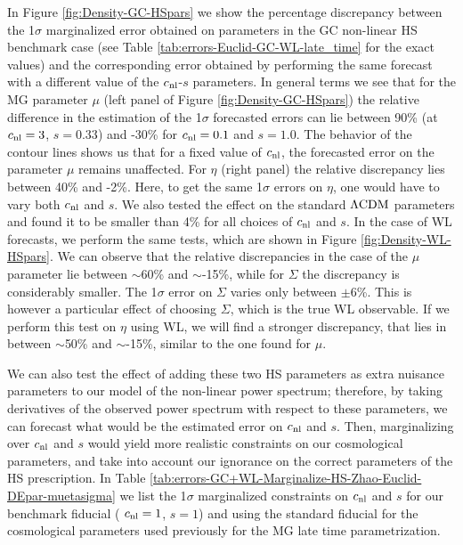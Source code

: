In Figure \ref{fig:Density-GC-HSpars} we show
the percentage discrepancy between the 1$\sigma$ marginalized error
obtained on parameters in the GC non-linear HS benchmark case (see Table
\ref{tab:errors-Euclid-GC-WL-late_time}
for the exact values) and the corresponding error obtained by performing
the same forecast with a different value of the $c_{\mathrm{nl}}$-$s$ parameters.
In general terms we see that for the MG parameter $\mu$
(left panel of Figure \ref{fig:Density-GC-HSpars}) the relative difference
in the estimation of the 1$\sigma$ forecasted errors can lie between
90\% (at $c_{\mathrm{nl}}=3$, $s=0.33$) and -30\% for $c_{\mathrm{nl}}=0.1$ and $s=1.0$.
The behavior of the contour lines shows us that for a fixed value of $c_{\mathrm{nl}}$, 
the forecasted error on the parameter $\mu$ remains unaffected.
For $\eta$ (right panel) the relative discrepancy lies between
40\% and -2\%. Here, to get the same 1$\sigma$ errors on $\eta$, one would have to vary 
both $c_{\mathrm{nl}}$ and $s$.
We also tested the effect on the standard $\Lambda\mathrm{CDM}$ parameters and found it to be smaller than
4\% for all choices of $c_{\mathrm{nl}}$ and $s$.
In the case of WL forecasts, we perform the same tests, which are shown in Figure \ref{fig:Density-WL-HSpars}.
We can observe that the relative discrepancies in the case of the
$\mu$ parameter lie between $\sim$60\% and $\sim$-15\%, while for $\Sigma$ the discrepancy is considerably smaller. 
The 1$\sigma$ error on $\Sigma$ varies only between $\pm 6$\%.
This is however a particular effect of choosing $\Sigma$, which is the true WL observable.
If we perform this test on $\eta$ using WL, we will find a stronger discrepancy,
that lies in between $\sim$50\% and $\sim$-15\%, similar to the one found for $\mu$.
 

We can also test the effect of adding these two HS parameters as extra
nuisance parameters to our model of the non-linear power spectrum;
therefore, by taking derivatives of the observed power spectrum with
respect to these parameters, we can forecast what would be the estimated
error on $c_{\mathrm{nl}}$ and $s$. Then, marginalizing over $c_{\mathrm{nl}}$ and
$s$ would yield more realistic constraints on our cosmological parameters,
and take into account our ignorance on the correct parameters
of the HS prescription. In Table
\ref{tab:errors-GC+WL-Marginalize-HS-Zhao-Euclid-DEpar-muetasigma}
we list the 1$\sigma$ marginalized constraints on $c_{\mathrm{nl}}$ and
$s$ for our benchmark fiducial ( $c_{\mathrm{nl}}=1$, $s=1$) and using the
standard fiducial for the cosmological parameters used previously
for the MG late time parametrization.

